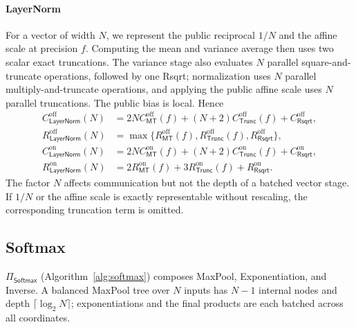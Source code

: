\documentclass[journal]{IEEEtran}
\theoremstyle{definition}
\theoremstyle{plain}
\begin{document}
\paragraph*{LayerNorm}
For a vector of width $N$, we represent the public reciprocal $1/N$ and the
affine scale at precision $f$. Computing the mean and variance average then
uses two scalar exact truncations. The variance stage also evaluates $N$
parallel square-and-truncate operations, followed by one Rsqrt; normalization
uses $N$ parallel multiply-and-truncate operations, and applying the public
affine scale uses $N$ parallel truncations. The public bias is local. Hence
\begin{equation}
\begin{aligned}
C^{\mathrm{off}}_{\mathsf{LayerNorm}}(N)
 &=2N C^{\mathrm{off}}_{\mathsf{MT}}(f)
   +(N+2)C^{\mathrm{off}}_{\mathsf{Trunc}}(f)
   +C^{\mathrm{off}}_{\mathsf{Rsqrt}},\\
R^{\mathrm{off}}_{\mathsf{LayerNorm}}(N)
 &=\max\{R^{\mathrm{off}}_{\mathsf{MT}}(f),
          R^{\mathrm{off}}_{\mathsf{Trunc}}(f),R^{\mathrm{off}}_{\mathsf{Rsqrt}}\},\\
C^{\mathrm{on}}_{\mathsf{LayerNorm}}(N)
 &=2N C^{\mathrm{on}}_{\mathsf{MT}}(f)
   +(N+2)C^{\mathrm{on}}_{\mathsf{Trunc}}(f)
   +C^{\mathrm{on}}_{\mathsf{Rsqrt}},\\
R^{\mathrm{on}}_{\mathsf{LayerNorm}}(N)
 &=2R^{\mathrm{on}}_{\mathsf{MT}}(f)
   +3R^{\mathrm{on}}_{\mathsf{Trunc}}(f)
   +R^{\mathrm{on}}_{\mathsf{Rsqrt}}.
\end{aligned}
\label{eq:layernorm-cost}
\end{equation}
The factor $N$ affects communication but not the depth of a batched vector
stage. If $1/N$ or the affine scale is exactly representable without
rescaling, the corresponding truncation term is omitted.

\subsection{Softmax}
$\Pi_{\mathsf{Softmax}}$ (Algorithm~\ref{alg:softmax}) composes MaxPool,
Exponentiation, and Inverse. A balanced MaxPool tree over $N$ inputs has
$N-1$ internal nodes and depth $\lceil\log_2N\rceil$; exponentiations and the
final products are each batched across all coordinates.
\end{document}
